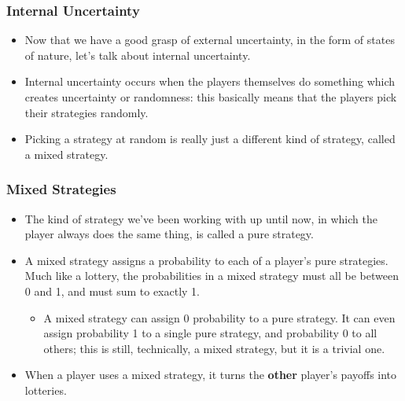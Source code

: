 
\begin{frame}
\frametitle{Internal Uncertainty}
\begin{itemize}
	\item Now that we have a good grasp of external uncertainty, in the form of states of nature, let's talk about \alert{internal uncertainty}.
	\item Internal uncertainty occurs when the players themselves do something which creates uncertainty or randomness: this basically means that the players pick their strategies randomly.
	\item Picking a strategy at random is really just a different kind of strategy, called a \alert{mixed strategy}.
\end{itemize}
\end{frame}

\begin{frame}
\frametitle{Mixed Strategies}
\begin{itemize}
	\item The kind of strategy we've been working with up until now, in which the player always does the same thing, is called a \alert{pure strategy}.
	\item A mixed strategy assigns a probability to each of a player's pure strategies. Much like a lottery, the probabilities in a mixed strategy must all be between 0 and 1, and must sum to exactly 1.
	\begin{itemize}
		\item A mixed strategy can assign 0 probability to a pure strategy. It can even assign probability 1 to a single pure strategy, and probability 0 to all others; this is still, technically, a mixed strategy, but it is a trivial one.
	\end{itemize}
	\item When a player uses a mixed strategy, it turns the \textbf{other} player's payoffs into lotteries.
\end{itemize}
\end{frame}


